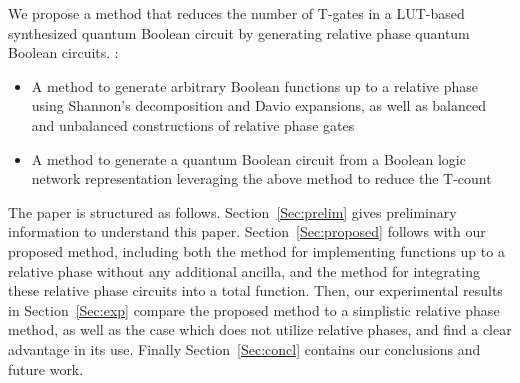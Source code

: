 We propose a method that reduces the number of T-gates in a LUT-based synthesized quantum Boolean circuit
by generating relative phase quantum Boolean circuits. :
\begin{itemize}
\item A method to generate arbitrary Boolean functions up to a relative phase using Shannon's decomposition and Davio
  expansions, as well as balanced and unbalanced constructions of relative phase gates
\item A method to generate a quantum Boolean circuit from a Boolean logic network representation leveraging the
  above method to reduce the T-count
\end{itemize}

The paper is structured as follows. Section~\ref{Sec:prelim} gives preliminary information to understand this paper. Section~\ref{Sec:proposed} follows with our proposed method, including both the method for implementing functions up to a relative phase without any additional ancilla, and the method for integrating these relative phase circuits into a total function. Then, our experimental results in Section~\ref{Sec:exp} compare the proposed method to a simplistic relative phase method, as well as the case which does not utilize relative phases, and find a clear advantage in its use. Finally Section~\ref{Sec:concl} contains our conclusions and future work.




